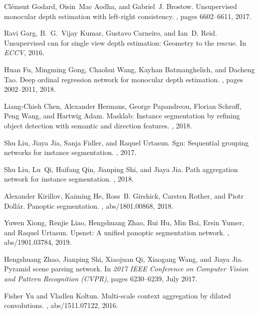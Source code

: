 \documentclass{article}
\begin{document}
{\begin{thebibliography}{10}
Cl{\'e}ment Godard, Oisin~Mac Aodha, and Gabriel~J. Brostow.
\newblock Unsupervised monocular depth estimation with left-right consistency.
, pages 6602--6611, 2017.

Ravi Garg, B.~G.~Vijay Kumar, Gustavo Carneiro, and Ian~D. Reid.
\newblock Unsupervised cnn for single view depth estimation: Geometry to the
  rescue.
\newblock In {\em ECCV}, 2016.

Huan Fu, Mingming Gong, Chaohui Wang, Kayhan Batmanghelich, and Dacheng Tao.
\newblock Deep ordinal regression network for monocular depth estimation.
, pages 2002--2011, 2018.

Liang-Chieh Chen, Alexander Hermans, George Papandreou, Florian Schroff, Peng
  Wang, and Hartwig Adam.
\newblock Masklab: Instance segmentation by refining object detection with
  semantic and direction features.
, 2018.

Shu Liu, Jiaya Jia, Sanja Fidler, and Raquel Urtasun.
\newblock Sgn: Sequential grouping networks for instance segmentation.
, 2017.

Shu Liu, Lu~Qi, Haifang Qin, Jianping Shi, and Jiaya Jia.
\newblock Path aggregation network for instance segmentation.
, 2018.

Alexander Kirillov, Kaiming He, Ross~B. Girshick, Carsten Rother, and Piotr
  Doll{\'{a}}r.
\newblock Panoptic segmentation.
, abs/1801.00868, 2018.

Yuwen Xiong, Renjie Liao, Hengshuang Zhao, Rui Hu, Min Bai, Ersin Yumer, and
  Raquel Urtasun.
\newblock Upsnet: {A} unified panoptic segmentation network.
, abs/1901.03784, 2019.

Hengshuang Zhao, Jianping Shi, Xiaojuan Qi, Xiaogang Wang, and Jiaya Jia.
\newblock Pyramid scene parsing network.
\newblock In {\em 2017 IEEE Conference on Computer Vision and Pattern
  Recognition (CVPR)}, pages 6230--6239, July 2017.

Fisher Yu and Vladlen Koltun.
\newblock Multi-scale context aggregation by dilated convolutions.
, abs/1511.07122, 2016.


\end{thebibliography}}
\end{document}
